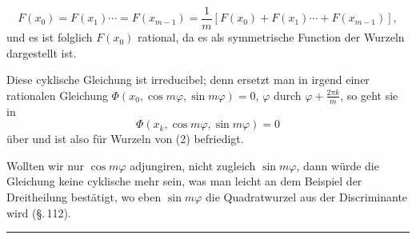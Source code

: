 \[
F(x_0) = F(x_1) \cdots = F(x_{m-1}) = \frac{1}{m}\left[F(x_0) + F(x_1) \cdots + F(x_{m-1})\right],
\]
und es ist folglich $F(x_0)$ rational, da es als symmetrische Function der Wurzeln dargestellt ist.


Diese cyklische Gleichung ist irreducibel; denn ersetzt man in irgend einer rationalen Gleichung $\Phi(x_0, \cos m\varphi, \sin m\varphi) = 0$, $\varphi$ durch $\varphi + \frac{2\pi k}{m}$, so geht sie in
\[
\Phi(x_k, \cos m\varphi, \sin m\varphi) = 0
\]
über und ist also für  Wurzeln von (2) befriedigt.

Wollten wir nur $\cos m\varphi$ adjungiren, nicht zugleich $\sin m\varphi$, dann würde die Gleichung keine cyklische mehr sein, was man leicht an dem Beispiel der Dreitheilung bestätigt, wo eben $\sin m\varphi$ die Quadratwurzel aus der Discriminante wird (\S.\,112).

\begin{center}
\rule{3cm}{0.4pt}
\end{center}

